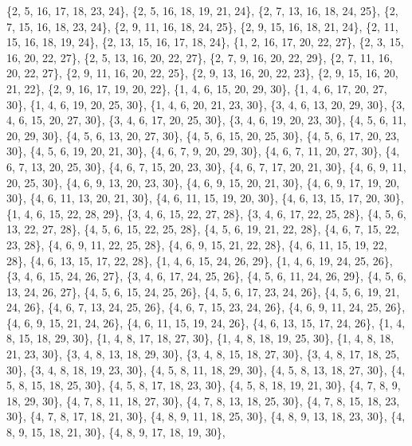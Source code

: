 \documentclass[11pt,a4paper]{article}
\begin{document}
{\{2, 5, 16, 17, 18, 23, 24\}, \{2, 5, 16, 18, 19, 21, 24\}, \{2, 7, 13, 16, 18, 24, 25\}, \{2, 7, 15, 16, 18, 23, 24\}, \{2, 9, 11, 16, 18, 24, 25\},
\{2, 9, 15, 16, 18, 21, 24\}, \{2, 11, 15, 16, 18, 19, 24\}, \{2, 13, 15, 16, 17, 18, 24\}, \{1, 2, 16, 17, 20, 22, 27\}, \{2, 3, 15, 16, 20, 22, 27\},
\{2, 5, 13, 16, 20, 22, 27\}, \{2, 7, 9, 16, 20, 22, 29\}, \{2, 7, 11, 16, 20, 22, 27\}, \{2, 9, 11, 16, 20, 22, 25\}, \{2, 9, 13, 16, 20, 22, 23\},
\{2, 9, 15, 16, 20, 21, 22\}, \{2, 9, 16, 17, 19, 20, 22\}, \{1, 4, 6, 15, 20, 29, 30\}, \{1, 4, 6, 17, 20, 27, 30\}, \{1, 4, 6, 19, 20, 25, 30\},
\{1, 4, 6, 20, 21, 23, 30\}, \{3, 4, 6, 13, 20, 29, 30\}, \{3, 4, 6, 15, 20, 27, 30\}, \{3, 4, 6, 17, 20, 25, 30\}, \{3, 4, 6, 19, 20, 23, 30\},
\{4, 5, 6, 11, 20, 29, 30\}, \{4, 5, 6, 13, 20, 27, 30\}, \{4, 5, 6, 15, 20, 25, 30\}, \{4, 5, 6, 17, 20, 23, 30\}, \{4, 5, 6, 19, 20, 21, 30\},
\{4, 6, 7, 9, 20, 29, 30\}, \{4, 6, 7, 11, 20, 27, 30\}, \{4, 6, 7, 13, 20, 25, 30\}, \{4, 6, 7, 15, 20, 23, 30\}, \{4, 6, 7, 17, 20, 21, 30\},
\{4, 6, 9, 11, 20, 25, 30\}, \{4, 6, 9, 13, 20, 23, 30\}, \{4, 6, 9, 15, 20, 21, 30\}, \{4, 6, 9, 17, 19, 20, 30\}, \{4, 6, 11, 13, 20, 21, 30\},
\{4, 6, 11, 15, 19, 20, 30\}, \{4, 6, 13, 15, 17, 20, 30\}, \{1, 4, 6, 15, 22, 28, 29\}, \{3, 4, 6, 15, 22, 27, 28\}, \{3, 4, 6, 17, 22, 25, 28\},
\{4, 5, 6, 13, 22, 27, 28\}, \{4, 5, 6, 15, 22, 25, 28\}, \{4, 5, 6, 19, 21, 22, 28\}, \{4, 6, 7, 15, 22, 23, 28\}, \{4, 6, 9, 11, 22, 25, 28\},
\{4, 6, 9, 15, 21, 22, 28\}, \{4, 6, 11, 15, 19, 22, 28\}, \{4, 6, 13, 15, 17, 22, 28\}, \{1, 4, 6, 15, 24, 26, 29\}, \{1, 4, 6, 19, 24, 25, 26\},
\{3, 4, 6, 15, 24, 26, 27\}, \{3, 4, 6, 17, 24, 25, 26\}, \{4, 5, 6, 11, 24, 26, 29\}, \{4, 5, 6, 13, 24, 26, 27\}, \{4, 5, 6, 15, 24, 25, 26\},
\{4, 5, 6, 17, 23, 24, 26\}, \{4, 5, 6, 19, 21, 24, 26\}, \{4, 6, 7, 13, 24, 25, 26\}, \{4, 6, 7, 15, 23, 24, 26\}, \{4, 6, 9, 11, 24, 25, 26\},
\{4, 6, 9, 15, 21, 24, 26\}, \{4, 6, 11, 15, 19, 24, 26\}, \{4, 6, 13, 15, 17, 24, 26\}, \{1, 4, 8, 15, 18, 29, 30\}, \{1, 4, 8, 17, 18, 27, 30\},
\{1, 4, 8, 18, 19, 25, 30\}, \{1, 4, 8, 18, 21, 23, 30\}, \{3, 4, 8, 13, 18, 29, 30\}, \{3, 4, 8, 15, 18, 27, 30\}, \{3, 4, 8, 17, 18, 25, 30\},
\{3, 4, 8, 18, 19, 23, 30\}, \{4, 5, 8, 11, 18, 29, 30\}, \{4, 5, 8, 13, 18, 27, 30\}, \{4, 5, 8, 15, 18, 25, 30\}, \{4, 5, 8, 17, 18, 23, 30\},
\{4, 5, 8, 18, 19, 21, 30\}, \{4, 7, 8, 9, 18, 29, 30\}, \{4, 7, 8, 11, 18, 27, 30\}, \{4, 7, 8, 13, 18, 25, 30\}, \{4, 7, 8, 15, 18, 23, 30\},
\{4, 7, 8, 17, 18, 21, 30\}, \{4, 8, 9, 11, 18, 25, 30\}, \{4, 8, 9, 13, 18, 23, 30\}, \{4, 8, 9, 15, 18, 21, 30\}, \{4, 8, 9, 17, 18, 19, 30\},
}
\end{document}
